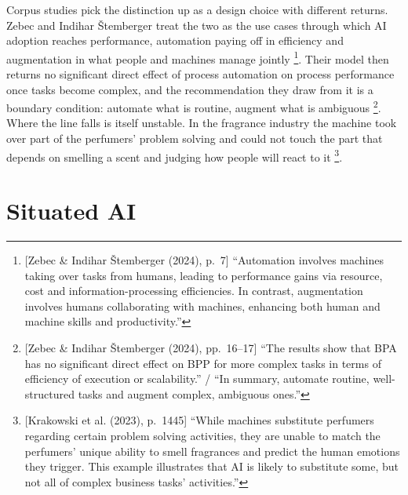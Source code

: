 Corpus studies pick the distinction up as a design choice with different returns. Zebec
and Indihar {\v S}temberger treat the two as the use cases through which AI adoption
reaches performance, automation paying off in efficiency and augmentation in what people
and machines manage
jointly \parencite[p.~7]{zebec2024creating}\footnote{[Zebec \& Indihar {\v S}temberger
(2024), p.~7] ``Automation involves machines taking over tasks from humans, leading to
performance gains via resource, cost and information-processing efficiencies. In
contrast, augmentation involves humans collaborating with machines, enhancing both human
and machine skills and productivity.''}. Their model then returns no significant direct
effect of process automation on process performance once tasks become complex, and the
recommendation they draw from it is a boundary condition: automate what is routine,
augment what is
ambiguous \parencite[pp.~16--17]{zebec2024creating}\footnote{[Zebec \& Indihar
{\v S}temberger (2024), pp.~16--17] ``The results show that BPA has no significant direct
effect on BPP for more complex tasks in terms of efficiency of execution or scalability.''
/ ``In summary, automate routine, well-structured tasks and augment complex, ambiguous
ones.''}. Where the line falls is itself unstable. In the fragrance industry the machine
took over part of the perfumers' problem solving and could not touch the part that
depends on smelling a scent and judging how people will react to
it \parencite[p.~1445]{krakowski2023artificial}\footnote{[Krakowski et al. (2023),
p.~1445] ``While machines substitute perfumers regarding certain problem solving
activities, they are unable to match the perfumers' unique ability to smell fragrances
and predict the human emotions they trigger. This example illustrates that AI is likely
to substitute some, but not all of complex business tasks' activities.''}.

\section{Situated AI}
\label{sec:situated}

